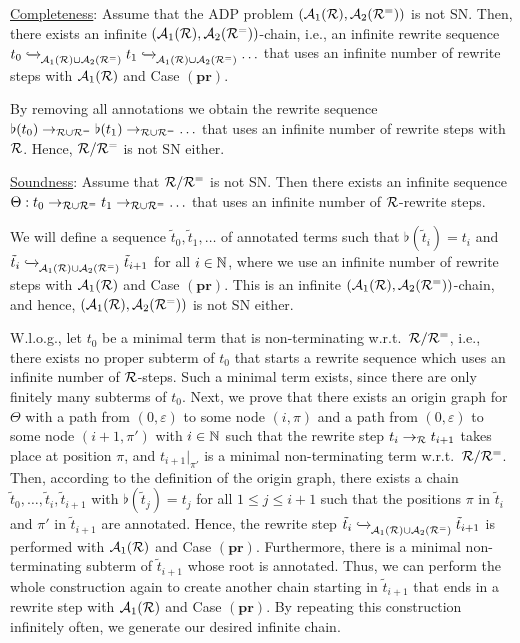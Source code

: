\begin{myproof}
    \underline{Completeness}:
    Assume that the ADP problem $(\mathcal{A}_{1}(\mathcal{R}), \mathcal{A}_{2}(\mathcal{R}^{=}))$ is not SN.
    Then, there exists an infinite $(\mathcal{A}_{1}(\mathcal{R}), \mathcal{A}_{2}(\mathcal{R}^{=}))$-chain,
    i.e., an infinite rewrite sequence $t_0 \mathrel{ \xhookrightarrow{{}_{\scriptstyle }} \!\!{}^{}_{\mathcal{A}_{1}(\mathcal{R}) \cup \mathcal{A}_{2}(\mathcal{R}^{=})} } t_{1} \mathrel{ \xhookrightarrow{{}_{\scriptstyle }} \!\!{}^{}_{\mathcal{A}_{1}(\mathcal{R}) \cup \mathcal{A}_{2}(\mathcal{R}^{=})} } \ldots$
    that uses an infinite number of rewrite steps with $\mathcal{A}_{1}(\mathcal{R})$ and Case $(\mathbf{pr})$.
    
    By removing all annotations we obtain the rewrite sequence
    $\flat(t_0) \to_{\mathcal{R} \cup \mathcal{R}^{=}} \flat(t_1) \to_{\mathcal{R} \cup \mathcal{R}^{=}} \ldots$
    that uses an infinite number of rewrite steps with $\mathcal{R}$.
    Hence, $\mathcal{R} / \mathcal{R}^{=}$ is not SN either.

    \smallskip

    \noindent
    \underline{Soundness}:
    Assume that $\mathcal{R} / \mathcal{R}^{=}$ is not SN.
    Then there exists an infinite sequence $\Theta: t_0 \to_{\mathcal{R} \cup \mathcal{R}^{=}} t_1 \to_{\mathcal{R} \cup \mathcal{R}^{=}} \ldots$ 
    that uses an infinite number of $\mathcal{R}$-rewrite steps.

    We will define a sequence $\tilde{t}_0, \tilde{t}_1, \ldots$ of annotated terms 
    such that $\flat(\tilde{t}_i) = t_i$ and
    $\tilde{t}_i \mathrel{ \xhookrightarrow{{}_{\scriptstyle }} \!\!{}^{}_{\mathcal{A}_{1}(\mathcal{R}) \cup \mathcal{A}_{2}(\mathcal{R}^{=})} } \tilde{t}_{i+1}$ for all
    $i \in \mathbb{N}$, 
    where we use an infinite number of rewrite steps with $\mathcal{A}_{1}(\mathcal{R})$ and Case $(\mathbf{pr})$.
    This is an infinite $(\mathcal{A}_{1}(\mathcal{R}), \mathcal{A}_{2}(\mathcal{R}^{=}))$-chain, and hence, $(\mathcal{A}_{1}(\mathcal{R}), \mathcal{A}_{2}(\mathcal{R}^{=}))$ is not SN either.

    W.l.o.g., let $t_0$ be a minimal term that is
    non-terminating w.r.t.\ $\mathcal{R}/\mathcal{R}^{=}$, i.e., there exists no proper subterm of $t_0$ that starts 
    a rewrite sequence which uses an infinite number of $\mathcal{R}$-steps.
    Such a minimal term exists, since there are only finitely many subterms of $t_0$.
    Next, we prove that there exists an origin graph for $\Theta$ with a path from
    $(0,\varepsilon)$ to some node $(i,\pi)$
    and a path  from  $(0,\varepsilon)$ to some node  $(i+1,\pi')$ with $i \in \mathbb{N}$ such that
    the rewrite step $t_i \to_{\mathcal{R}} t_{i+1}$ takes place at position $\pi$, and
    $t_{i+1}|_{\pi'}$ is a minimal non-terminating term w.r.t.\ $\mathcal{R}/\mathcal{R}^{=}$.
    Then, according to the definition of the origin graph, there exists a chain
    $\tilde{t}_0, \ldots, \tilde{t}_i,
    \tilde{t}_{i+1}$ with $\flat(\tilde{t}_j) = t_j$ for all $1 \leq j \leq i+1$
    such that the positions $\pi$ in $\tilde{t}_i$ and $\pi'$ in $\tilde{t}_{i+1}$ are annotated.
    Hence, the  rewrite step
 $\tilde{t}_i \mathrel{ \xhookrightarrow{{}_{\scriptstyle }} \!\!{}^{}_{\mathcal{A}_{1}(\mathcal{R}) \cup \mathcal{A}_{2}(\mathcal{R}^{=})} } \tilde{t}_{i+1}$ 
    is performed with $\mathcal{A}_{1}(\mathcal{R})$ and Case $(\mathbf{pr})$.
    Furthermore, there is a minimal non-terminating subterm of $\tilde{t}_{i+1}$ whose root is annotated.
    Thus, we can perform the whole construction again to create another chain
    starting in $\tilde{t}_{i+1}$
    that ends in a rewrite step with $\mathcal{A}_{1}(\mathcal{R})$ and Case $(\mathbf{pr})$.
    By repeating this construction infinitely often, we generate our desired infinite chain.




\end{myproof}
